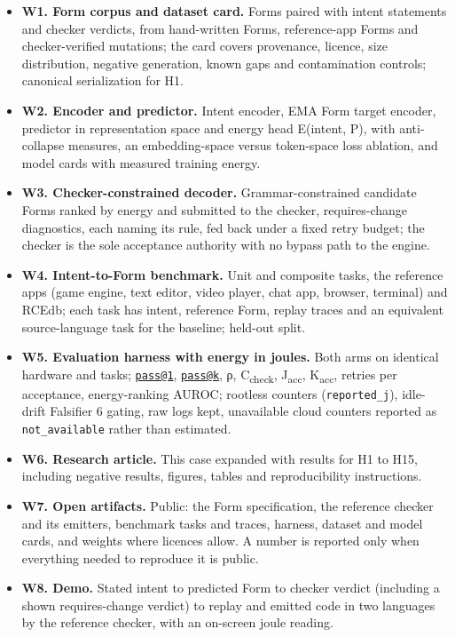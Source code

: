\documentclass[10pt,letterpaper]{article}
\providecommand{\tightlist}{\setlength{\itemsep}{1pt}\setlength{\parskip}{0pt}}
\begin{document}
\begin{itemize}
\tightlist
\item
  \textbf{W1. Form corpus and dataset card.} Forms paired with intent
  statements and checker verdicts, from hand-written Forms,
  reference-app Forms and checker-verified mutations; the card covers
  provenance, licence, size distribution, negative generation, known
  gaps and contamination controls; canonical serialization for H1.
\item
  \textbf{W2. Encoder and predictor.} Intent encoder, EMA Form target
  encoder, predictor in representation space and energy head E(intent,
  P), with anti-collapse measures, an embedding-space versus token-space
  loss ablation, and model cards with measured training energy.
\item
  \textbf{W3. Checker-constrained decoder.} Grammar-constrained
  candidate Forms ranked by energy and submitted to the checker,
  requires-change diagnostics, each naming its rule, fed back under a
  fixed retry budget; the checker is the sole acceptance authority with
  no bypass path to the engine.
\item
  \textbf{W4. Intent-to-Form benchmark.} Unit and composite tasks, the
  reference apps (game engine, text editor, video player, chat app,
  browser, terminal) and RCEdb; each task has intent, reference Form,
  replay traces and an equivalent source-language task for the baseline;
  held-out split.
\item
  \textbf{W5. Evaluation harness with energy in joules.} Both arms on
  identical hardware and tasks;
  \href{mailto:pass@1}{\nolinkurl{pass@1}},
  \href{mailto:pass@k}{\nolinkurl{pass@k}}, ρ, C\textsubscript{check},
  J\textsubscript{acc}, K\textsubscript{acc}, retries per acceptance,
  energy-ranking AUROC; rootless counters (\texttt{reported\_\allowbreak{}j}),
  idle-drift Falsifier 6 gating, raw logs kept, unavailable cloud
  counters reported as \texttt{not\_\allowbreak{}available} rather than estimated.
\item
  \textbf{W6. Research article.} This case expanded with results for H1
  to H15, including negative results, figures, tables and
  reproducibility instructions.
\item
  \textbf{W7. Open artifacts.} Public: the Form specification, the
  reference checker and its emitters, benchmark tasks and traces,
  harness, dataset and model cards, and weights where licences allow. A
  number is reported only when everything needed to reproduce it is
  public.
\item
  \textbf{W8. Demo.} Stated intent to predicted Form to checker verdict
  (including a shown requires-change verdict) to replay and emitted code
  in two languages by the reference checker, with an on-screen joule
  reading.
\end{itemize}
\end{document}
